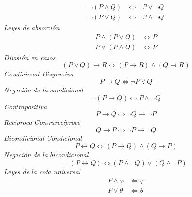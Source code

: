 \begin{multicols}{2}
\[\begin{aligned}
      \neg(P\land Q) &\Leftrightarrow \neg P\lor\neg Q \\
      \neg(P\lor Q) &\Leftrightarrow \neg P\land\neg Q
    \end{aligned}
  \]
  \emph{Leyes de absorción}
  \[
    \begin{aligned}
      P\land(P\lor Q) &\Leftrightarrow P \\
      P\lor(P\land Q) &\Leftrightarrow P
    \end{aligned}
  \]
  \emph{División en casos}
  \[
    (P\lor Q)\to R \Leftrightarrow (P\to R)\land(Q\to R) 
  \]
  \emph{Condicional-Disyuntiva}
  \[
    P\to Q \Leftrightarrow \neg P\lor Q
  \]
  \emph{Negación de la condicional}
  \[
    \neg(P\to Q) \Leftrightarrow P\land\neg Q
  \]
  \emph{Contrapositiva}
  \[
    P\to Q\Leftrightarrow\neg Q\to\neg P
  \]
  \emph{Recíproca-Contrarecíproca}
  \[
    Q\to P \Leftrightarrow \neg P\to\neg Q
  \]
  \emph{Bicondicional-Condicional}
  \[
    P\leftrightarrow Q \Leftrightarrow (P\to Q)\land(Q\to P)
  \]
  \emph{Negación de la bicondicional}
  \[
    \neg(P\leftrightarrow Q)\Leftrightarrow (P\land\neg Q)\lor(Q\land\neg P)
  \]
  \emph{Leyes de la cota universal}
  \[
    \begin{aligned}
      P\land\varphi &\Leftrightarrow\varphi \\
      P\lor\theta &\Leftrightarrow\theta
    \end{aligned}
  \]
\end{multicols}
